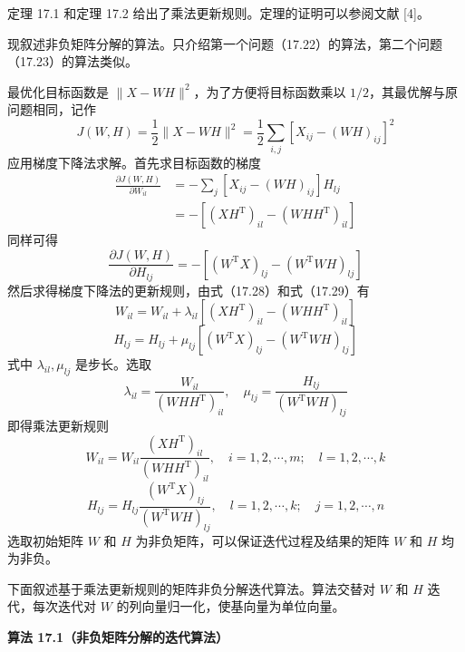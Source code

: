 \documentclass[UTF8,12pt,a4paper,fontset=fandol]{ctexart}
\begin{document}
定理 17.1 和定理 17.2 给出了乘法更新规则。定理的证明可以参阅文献 [4]。

现叙述非负矩阵分解的算法。只介绍第一个问题（17.22）的算法，第二个问题（17.23）的算法类似。

最优化目标函数是 $\|X-WH\|^2$，为了方便将目标函数乘以 $1/2$，其最优解与原问题相同，记作
\[
J(W,H)=\frac{1}{2}\|X-WH\|^2=\frac{1}{2}\sum_{i,j}[X_{ij}-(WH)_{ij}]^2
\]
应用梯度下降法求解。首先求目标函数的梯度
\begin{equation}
\begin{aligned}
\frac{\partial J(W,H)}{\partial W_{il}}
&=-\sum_j[X_{ij}-(WH)_{ij}]H_{lj}\\
&=-[(XH^{\mathrm{T}})_{il}-(WHH^{\mathrm{T}})_{il}]
\end{aligned}
\tag{17.28}
\end{equation}
同样可得
\begin{equation}
\frac{\partial J(W,H)}{\partial H_{lj}}
=-[(W^{\mathrm{T}}X)_{lj}-(W^{\mathrm{T}}WH)_{lj}]
\tag{17.29}
\end{equation}
然后求得梯度下降法的更新规则，由式（17.28）和式（17.29）有
\begin{equation}
W_{il}=W_{il}+\lambda_{il}[(XH^{\mathrm{T}})_{il}-(WHH^{\mathrm{T}})_{il}]
\tag{17.30}
\end{equation}
\begin{equation}
H_{lj}=H_{lj}+\mu_{lj}[(W^{\mathrm{T}}X)_{lj}-(W^{\mathrm{T}}WH)_{lj}]
\tag{17.31}
\end{equation}
式中 $\lambda_{il},\mu_{lj}$ 是步长。选取
\begin{equation}
\lambda_{il}=\frac{W_{il}}{(WHH^{\mathrm{T}})_{il}},\quad
\mu_{lj}=\frac{H_{lj}}{(W^{\mathrm{T}}WH)_{lj}}
\tag{17.32}
\end{equation}
即得乘法更新规则
\begin{equation}
W_{il}=W_{il}\frac{(XH^{\mathrm{T}})_{il}}{(WHH^{\mathrm{T}})_{il}},\quad
i=1,2,\cdots,m;\quad l=1,2,\cdots,k
\tag{17.33}
\end{equation}
\begin{equation}
H_{lj}=H_{lj}\frac{(W^{\mathrm{T}}X)_{lj}}{(W^{\mathrm{T}}WH)_{lj}},\quad
l=1,2,\cdots,k;\quad j=1,2,\cdots,n
\tag{17.34}
\end{equation}
选取初始矩阵 $W$ 和 $H$ 为非负矩阵，可以保证迭代过程及结果的矩阵 $W$ 和 $H$ 均为非负。

下面叙述基于乘法更新规则的矩阵非负分解迭代算法。算法交替对 $W$ 和 $H$ 迭代，每次迭代对 $W$ 的列向量归一化，使基向量为单位向量。

\noindent\textbf{算法 17.1（非负矩阵分解的迭代算法）}
\end{document}

